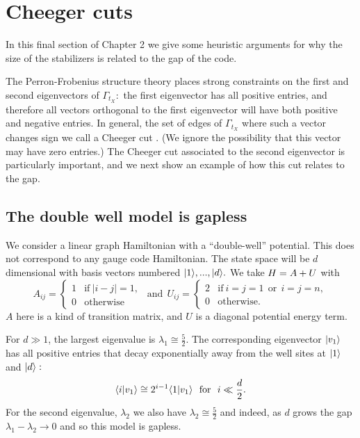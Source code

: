 \section{Cheeger cuts}

In this final section of Chapter 2 
we give some heuristic
arguments for why the size of the stabilizers is
related to the gap of the code. 

The Perron-Frobenius structure theory places
strong constraints on the first and second
eigenvectors of $\Gamma_{t_X}:$
the first eigenvector has all positive entries,
and therefore all vectors orthogonal to the first
eigenvector will have both positive and negative entries.
In general, the set of edges of $\Gamma_{t_X}$ where
such a vector changes sign we call a Cheeger cut 
\cite{Cheeger1970,Chung1997}.
(We ignore the possibility that this vector
may have zero entries.)
The Cheeger cut associated to the second eigenvector
is particularly important, and we next show an
example of how this cut relates to the gap.

\subsection{The double well model is gapless}

We consider a linear graph Hamiltonian
with a ``double-well'' potential.
This does not correspond to any gauge code Hamiltonian.
The state space will be $d$ dimensional with
basis vectors numbered $|{1}\rangle,...,|{d}\rangle.$
We take
$ H = A + U $
with
$$
A_{ij} = \left\{ \begin{array}{ll}
     1 &\mbox{if}\  |i-j|=1,  \\
     0 &\mbox{otherwise}\end{array}\right.
\ \ \mbox{and}\ \ 
U_{ij} =  \left\{ \begin{array}{ll}
     2 &\mbox{if}\  i=j=1 \ \ \mbox{or}\ \  i=j=n, \\
     0 &\mbox{otherwise.}\end{array}\right.
$$
$A$ here is a kind of transition matrix,
and $U$ is a diagonal potential energy term.

For $d\gg 1$, the largest
eigenvalue is $\lambda_1 \cong \frac{5}{2}$.
The corresponding eigenvector $|{v_1}\rangle$
has all positive entries that
decay exponentially away from the well sites
at $|{1}\rangle$ and $|{d}\rangle:$
$$
    \langle{i}|{v_1}\rangle 
    \cong 2^{i-1} \langle{1}|{v_1}\rangle
    \ \ \mbox{for}\ \ i\ll \frac{d}{2}.
$$
For the second eigenvalue, $\lambda_2$
we also have  $\lambda_2 \cong \frac{5}{2}$
and indeed, as $d$ grows
the gap $\lambda_1 - \lambda_2 \rightarrow 0$
and so this model is gapless.

